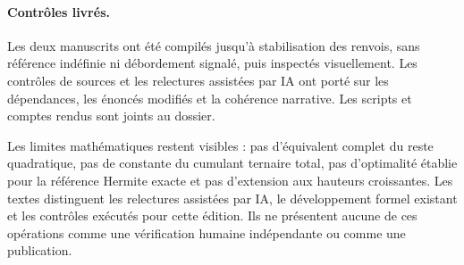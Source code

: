 \documentclass[11pt,a4paper]{article}
\newcommand{\validationlivree}{Les deux manuscrits ont été compilés jusqu'à stabilisation des renvois, sans référence indéfinie ni débordement signalé, puis inspectés visuellement. Les contrôles de sources et les relectures assistées par IA ont porté sur les dépendances, les énoncés modifiés et la cohérence narrative. Les scripts et comptes rendus sont joints au dossier.}
\begin{document}
\paragraph{Contrôles livrés.}
\validationlivree

Les limites mathématiques restent visibles : pas d'équivalent complet du reste quadratique, pas de constante du cumulant ternaire total, pas d'optimalité établie pour la référence Hermite exacte et pas d'extension aux hauteurs croissantes. Les textes distinguent les relectures assistées par IA, le développement formel existant et les contrôles exécutés pour cette édition. Ils ne présentent aucune de ces opérations comme une vérification humaine indépendante ou comme une publication.
\end{document}
